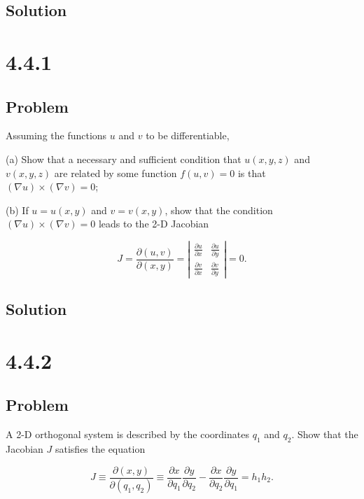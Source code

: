 \documentclass[12pt]{article}
\begin{document}
\subsection{Solution}

\newpage
\section{4.4.1}

\subsection{Problem}

Assuming the functions \(u\) and \(v\) to be differentiable,

(a) Show that a necessary and sufficient condition that \(u(x, y, z)\) and \(v(x, y, z)\) are related by some function \(f(u, v)=0\) is that \((\nabla u) \times(\nabla v)=0\);

(b) If \(u=u(x, y)\) and \(v=v(x, y)\), show that the condition \((\nabla u) \times(\nabla v)=0\) leads to the 2-D Jacobian

\[
    J=\frac{\partial(u, v)}{\partial(x, y)}=\left|\begin{array}{ll}
        \frac{\partial u}{\partial x} & \frac{\partial u}{\partial y} \\
        \frac{\partial v}{\partial x} & \frac{\partial v}{\partial y}
    \end{array}\right|=0 .
\]

\subsection{Solution}

\newpage
\section{4.4.2}

\subsection{Problem}

A 2-D orthogonal system is described by the coordinates \(q_{1}\) and \(q_{2}\). Show that the Jacobian \(J\) satisfies the equation

\[
    J \equiv \frac{\partial(x, y)}{\partial\left(q_{1}, q_{2}\right)} \equiv \frac{\partial x}{\partial q_{1}} \frac{\partial y}{\partial q_{2}}-\frac{\partial x}{\partial q_{2}} \frac{\partial y}{\partial q_{1}}=h_{1} h_{2} .
\]
\end{document}
